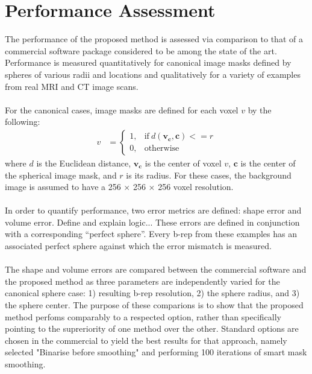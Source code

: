 \section{Performance Assessment}
%

The performance of the proposed method is assessed via comparison to that of a commercial software package considered to be among the state of the art. Performance is measured quantitatively for canonical image masks defined by spheres of various radii and locations and qualitatively for a variety of examples from real MRI and CT image scans. \\ \\
%
For the canonical cases, image masks are defined for each voxel ${v}$ by the following:
\begin{align} 
	v &=  \begin{cases}
		1, & \text{if}\ d \left(\bm{v_c},\bm{c}\right) <= r \\
		0, & \text{otherwise}
	\end{cases}
\end{align}
where $d$ is the Euclidean distance, $\bm{v_c}$ is the center of voxel $v$, $\bm{c}$ is the center of the spherical image mask, and $r$ is its radius. For these cases, the background image is assumed to have a 256 $\times$ 256 $\times$ 256 voxel resolution. \\ \\
%
In order to quantify performance, two error metrics are defined: shape error and volume error. Define and explain logic... These errors are defined in conjunction with a corresponding ``perfect sphere''. Every b-rep from these examples has an associated perfect sphere against which the error mismatch is measured.\\ \\
%
The shape and volume errors are compared between the commercial software and the proposed method as three parameters are independently varied for the canonical sphere case: 1) resulting b-rep resolution, 2) the sphere radius, and 3) the sphere center. The purpose of these comparions is to show that the proposed method perfoms comparably to a respected option, rather than specifically pointing to the supreriority of one method over the other. Standard options are chosen in the commercial to yield the best results for that approach, namely selected "Binarise before smoothing" and performing 100 iterations of smart mask smoothing. \\ \\
%
